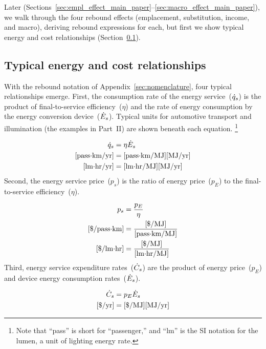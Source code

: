 \documentclass[12pt]{article}\usepackage[]{graphicx}\usepackage[]{xcolor}
\begin{document}
Later (Sections~\ref{sec:empl_effect_main_paper}--\ref{sec:macro_effect_main_paper}), 
we walk through the four rebound effects
(emplacement, substitution, income, and macro), 
deriving rebound expressions for each, 
but first 
we show typical energy and cost relationships 
(Section~\ref{sec:energy_and_cost_relationships}).


\subsection{Typical energy and cost relationships}
\label{sec:energy_and_cost_relationships}

With the rebound notation of Appendix~\ref{sec:nomenclature}, 
four typical relationships emerge.
First, the consumption rate of the energy service~($\dot{q}_s$)
is the product of final-to-service efficiency~($\eta$) and
the rate of energy consumption by the energy conversion device~($\dot{E}_s$).
Typical units for automotive transport and illumination
(the examples in Part~II) are shown
beneath each equation.%
\footnote{
  Note that ``pass'' is short for ``passenger,'' and
  ``lm'' is the SI notation for the lumen, a unit of lighting energy rate.
}

\begin{align} \label{eq:typ_qs_eta_Edot}
  \dot{q}_s &= \eta \dot{E}_s \\
  \text{[pass$\cdot$km/yr]} &= \text{[pass$\cdot$km/MJ]} \text{[MJ/yr]} \nonumber \\
  \text{[lm$\cdot$hr/yr]} &= [\text{lm$\cdot$hr/MJ}] \text{[MJ/yr]} \nonumber
\end{align}
%
Second, the energy service price~($p_s$) is the ratio of energy price~($p_E$) 
to the final-to-service efficiency~($\eta$).

\begin{align} \label{eq:ps_pE_eta}
  p_s &= \frac{p_E}{\eta} \\
  \text{[\$/pass$\cdot$km]} &= \frac{[\$/\text{MJ}]}{\text{[pass$\cdot$km/MJ]}} \nonumber \\
  \text{[\$/lm$\cdot$hr]} &= \frac{[\$/\text{MJ}]}{\text{[lm$\cdot$hr/MJ]}} \nonumber
\end{align}
%
Third, energy service expenditure rates~($\dot{C}_s$) are the product 
of energy price~($p_E$) and device energy consumption rates~($\dot{E}_s$).

\begin{align}
  \dot{C}_s &= p_E \dot{E}_s \\
  \text{[\$/yr]} &= \text{[\$/MJ]}\text{[MJ/yr]} \nonumber
\end{align}
\end{document}

